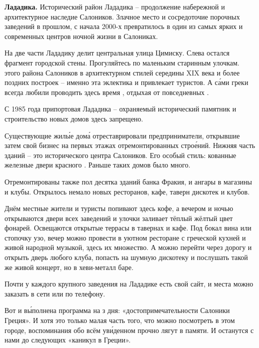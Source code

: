\textbf{Лададика.}
Исторический район Лададика -- продолжение набережной и архитектурное наследие Салоников. Злачное место и сосредоточие порочных заведений в прошлом, с начала 2000-х превратилось в один из самых ярких и современных центров ночной жизни в Салониках.

На две части Лададику делит центральная улица Цимиску. Слева остался фрагмент городской стены. Прогуляйтесь по маленьким старинным улочкам.  этого района Салоников в архитектурном  стилей середины XIX века и более поздних построек -- именно эта эклектика и привлекает туристов. А с\'{а}ми греки всегда любили проводить здесь время , отдыхая от повседневных .

С 1985 года припортовая Лададика -- охраняемый исторический памятник и строительство новых домов здесь запрещено.

Существующие жил\'{ы}е дом\'{а} отреставрировали предприниматели, открывшие затем свой бизнес на первых этажах отремонтированных стро\'{е}ний. Нижняя часть зданий -- это  исторического центра Салоников. Его особый стиль: кованные железные двери  красного . Раньше таких домов было много.

Отремонтированы также пол десятка зданий банка Фракия,  и ангары  в магазины и клубы. Открылось немало новых ресторанов, кафе, таверн дискотек и клубов.

Днём местные жители и туристы  попивают здесь кофе, а вечером и ночью открываются двери всех заведений и улочки заливает тёплый жёлтый цвет фонарей. Освещаются открытые террасы в тавернах и кафе. Под бокал вина или стопочку узо, вечер можно провести в уютном ресторане с греческой кухней и живой народной музыкой, здесь их множество. А можно перейти через дорогу и открыть дверь любого клуба, попасть на шумную дискотеку и послушать такой же живой концерт, но в хеви-металл баре.

Почти у каждого  крупного заведения на Лададике есть свой сайт, и места можно заказать  в сети или по телефону.

Вот и в\'{ы}полнена программа на з дня: «достопримечательности Салоники Греция». И хотя это только малая часть того, что можно посмотреть в этом городе, воспоминания обо всём ув\'{и}денном прочно лягут в  памяти. И останутся с нами до следующих «каникул в Греции».

